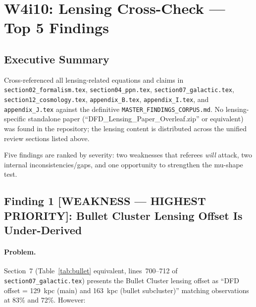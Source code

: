 
\section*{W4i10: Lensing Cross-Check --- Top 5 Findings}

\subsection*{Executive Summary}

Cross-referenced all lensing-related equations and claims in
\texttt{section02\_formalism.tex}, \texttt{section04\_ppn.tex},
\texttt{section07\_galactic.tex}, \texttt{section12\_cosmology.tex},
\texttt{appendix\_B.tex}, \texttt{appendix\_I.tex}, and
\texttt{appendix\_J.tex} against the definitive
\texttt{MASTER\_FINDINGS\_CORPUS.md}.  No lensing-specific standalone paper
(``DFD\_Lensing\_Paper\_Overleaf.zip'' or equivalent) was found in the
repository; the lensing content is distributed across the unified review
sections listed above.

Five findings are ranked by severity: two weaknesses that referees
\emph{will} attack, two internal inconsistencies/gaps, and one opportunity
to strengthen the mu-shape test.

\subsection*{Finding 1 [WEAKNESS --- HIGHEST PRIORITY]:
Bullet Cluster Lensing Offset Is Under-Derived}

\paragraph{Problem.}
Section~7 (Table~\ref{tab:bullet} equivalent, lines~700--712 of
\texttt{section07\_galactic.tex}) presents the Bullet Cluster lensing
offset as ``DFD offset = 129~kpc (main) and 163~kpc (bullet
subcluster)'' matching observations at 83\% and 72\%.  However:

